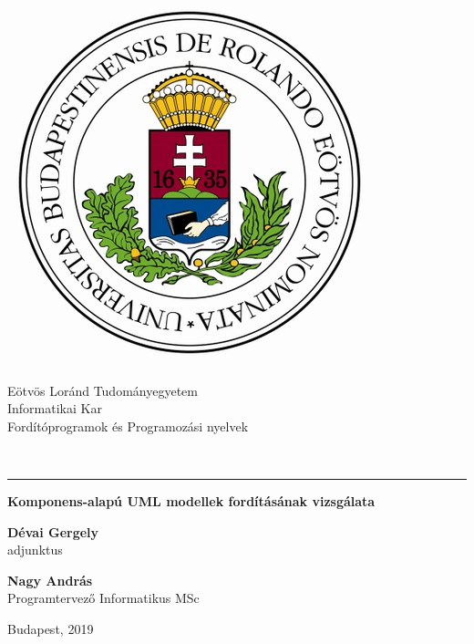 \begin{titlepage}

\begin{minipage}{0.40\linewidth}
\includegraphics[scale=0.3]{elte-cimer}
\end{minipage}
\begin{minipage}{0.50\linewidth}
\begin{center}
Eötvös Loránd Tudományegyetem \\
Informatikai Kar \\
Fordítóprogramok és Programozási nyelvek
\end{center}
\end{minipage} \\

\hrule
\vfill

\begin{center}
\Huge
\textbf{Komponens-alapú UML modellek fordításának vizsgálata}
\normalsize
\end{center}

\vfill

\begin{minipage}[t]{0.5\linewidth}
\begin{flushleft}
\textbf{Dévai Gergely} \\
adjunktus
\end{flushleft}
\end{minipage}
\begin{minipage}[t]{0.5\linewidth}
\begin{flushright}
\textbf{Nagy András} \\
Programtervező Informatikus MSc
\end{flushright}
\end{minipage}

\vfill

\begin{center}
Budapest, 2019
\end{center}

\end{titlepage}